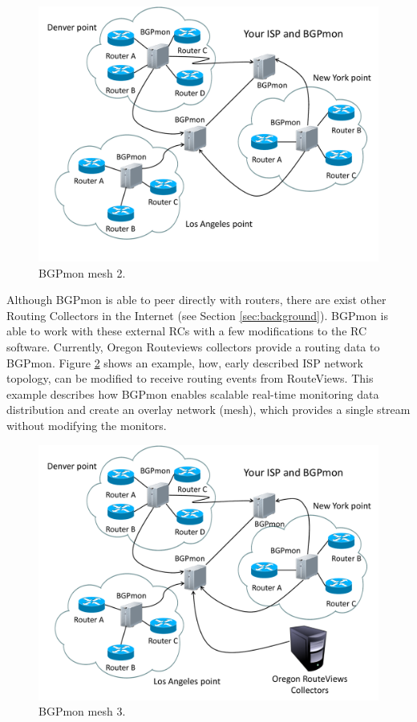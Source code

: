 \begin{figure}
\centering
\includegraphics[scale=0.30]{figs/your-isp-and-bgpmon2.pdf}
\caption{BGPmon mesh 2.}
\label{BGPmonmesh2}
\end{figure}

Although BGPmon is able to peer directly with routers, there are exist other Routing Collectors in the Internet (see Section \ref{sec:background}). BGPmon is able to work with these external RCs with a few modifications to the RC software. Currently, Oregon Routeviews\cite{routeviews} collectors provide a routing data to BGPmon. Figure \ref{BGPmonmesh3} shows an example, how, early described ISP network topology, can be modified to receive routing events from RouteViews. This example describes how BGPmon enables scalable real-time monitoring data distribution and create an overlay network (mesh), which provides a single stream without modifying the monitors. 




\begin{figure}
\centering
\includegraphics[scale=0.30]{figs/your-isp-and-bgpmon4.pdf}
\caption{BGPmon mesh 3.}
\label{BGPmonmesh3}
\end{figure}